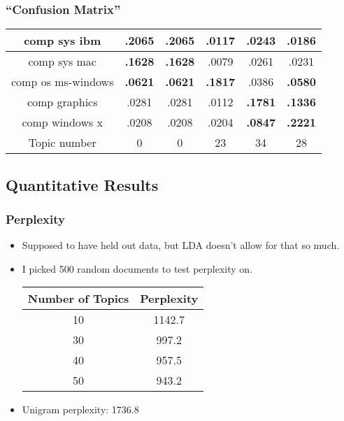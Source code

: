 \documentclass{beamer}
\begin{document}
\begin{frame}
  \frametitle{``Confusion Matrix''}
  \begin{tabular}{|c|c|c|c|c|c|}
	\hline
	comp sys ibm&\bf{.2065}&\bf{.2065}&.0117&.0243&.0186 \\
	\hline
	comp sys mac&\bf{.1628}&\bf{.1628}&.0079&.0261&.0231 \\
	\hline
	comp os ms-windows&\bf{.0621}&\bf{.0621}&\bf{.1817}&.0386&\bf{.0580} \\
	\hline
	comp graphics&.0281&.0281&.0112&\bf{.1781}&\bf{.1336} \\
	\hline
	comp windows x&.0208&.0208&.0204&\bf{.0847}&\bf{.2221} \\
	\hline
	Topic number&0&0&23&34&28 \\
	\hline
  \end{tabular}
\end{frame}


\subsection{Quantitative Results}

\begin{frame}
  \frametitle{Perplexity}
  \begin{itemize}
	\item Supposed to have held out data, but LDA doesn't allow for that so
	  much.
	\item I picked 500 random documents to test perplexity on.
	  \begin{tabular}{|c|c|}
		\hline
		Number of Topics&Perplexity \\
		\hline
		10&1142.7 \\
		\hline
		30&997.2 \\
		\hline
		40&957.5 \\
		\hline
		50&943.2 \\
		\hline
	  \end{tabular}
	\item Unigram perplexity: 1736.8
  \end{itemize}
\end{frame}
\end{document}
